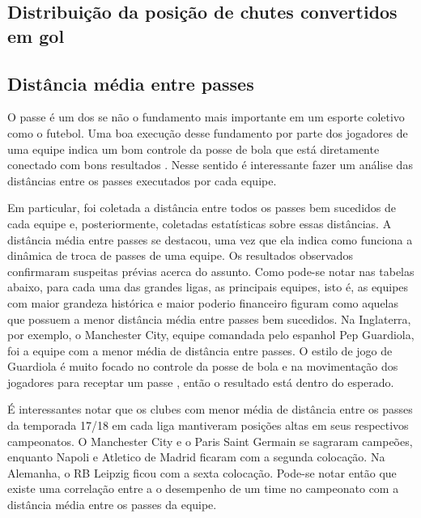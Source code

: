 \documentclass{article}
\begin{document}
\subsection{Distribuição da posição de chutes convertidos em gol}



\subsection{Distância média entre passes}

O passe é um dos se não o fundamento mais importante em um esporte coletivo
como o futebol. Uma boa execução desse fundamento por parte dos jogadores
de uma equipe indica um bom controle da posse de bola que está diretamente
conectado com bons resultados \cite{cox2022linhas}. Nesse sentido é
interessante fazer um análise
das distâncias entre os passes
executados por cada equipe.

Em particular, foi coletada a distância entre todos os passes bem sucedidos de
cada equipe e, posteriormente, coletadas estatísticas sobre essas distâncias. A
distância média
entre passes se destacou, uma vez que ela indica como funciona a dinâmica de
troca de passes de uma equipe. Os resultados observados confirmaram suspeitas
prévias acerca do assunto.
Como pode-se notar nas tabelas abaixo, para cada uma das grandes ligas, as
principais equipes, isto é, as equipes com maior grandeza histórica e maior
poderio financeiro figuram como aquelas
que possuem a menor distância média entre passes bem sucedidos. Na Inglaterra,
por exemplo, o Manchester City, equipe comandada pelo espanhol Pep Guardiola,
foi a equipe com a menor média
de distância entre passes. O estilo de jogo de Guardiola é muito focado no
controle da posse de bola e na movimentação dos jogadores para receptar um
passe \cite{terzis2023pep}, então o resultado está dentro do
esperado.

É interessantes notar que os clubes com menor média de distância entre os
passes da temporada 17/18 em cada liga mantiveram posições altas em seus
respectivos campeonatos. O Manchester City e o Paris Saint Germain se sagraram
campeões, enquanto Napoli e Atletico de Madrid ficaram com a segunda colocação.
Na Alemanha, o RB Leipzig ficou com a sexta colocação. Pode-se notar então que
existe uma correlação entre a o desempenho de um time no campeonato com a
distância média entre os passes da equipe.
\end{document}
